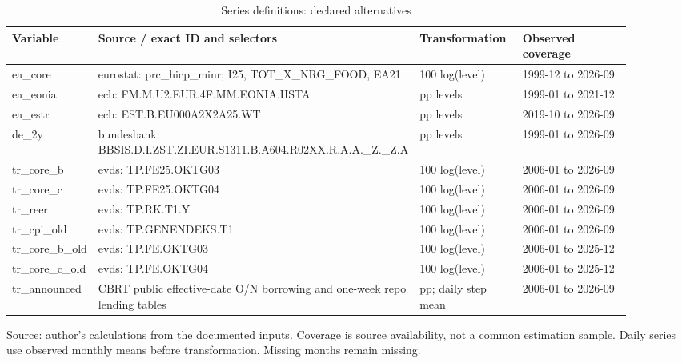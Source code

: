 \begin{table}[htbp]
\centering
\footnotesize
\caption{Series definitions: declared alternatives}
\begin{tabularx}{\linewidth}{p{0.12\linewidth}p{0.40\linewidth}p{0.17\linewidth}p{0.21\linewidth}}
\toprule
Variable & Source / exact ID and selectors & Transformation & Observed coverage \\
\midrule
ea\_\allowbreak{}core & eurostat: prc\_\allowbreak{}hicp\_\allowbreak{}minr; I25, TOT\_\allowbreak{}X\_\allowbreak{}NRG\_\allowbreak{}FOOD, EA21 & 100 log(level) & 1999-12 to 2026-09 \\
ea\_\allowbreak{}eonia & ecb: FM.\allowbreak{}M.\allowbreak{}U2.\allowbreak{}EUR.\allowbreak{}4F.\allowbreak{}MM.\allowbreak{}EONIA.\allowbreak{}HSTA & pp levels & 1999-01 to 2021-12 \\
ea\_\allowbreak{}estr & ecb: EST.B.EU000A2X2A25.WT & pp levels & 2019-10 to 2026-09 \\
de\_\allowbreak{}2y & bundesbank: BBSIS.\allowbreak{}D.\allowbreak{}I.\allowbreak{}ZST.\allowbreak{}ZI.\allowbreak{}EUR.\allowbreak{}S1311.\allowbreak{}B.\allowbreak{}A604.\allowbreak{}R02XX.\allowbreak{}R.\allowbreak{}A.\allowbreak{}A.\allowbreak{}\_\allowbreak{}Z.\allowbreak{}\_\allowbreak{}Z.\allowbreak{}A & pp levels & 1999-01 to 2026-09 \\
tr\_\allowbreak{}core\_\allowbreak{}b & evds: TP.FE25.OKTG03 & 100 log(level) & 2006-01 to 2026-09 \\
tr\_\allowbreak{}core\_\allowbreak{}c & evds: TP.FE25.OKTG04 & 100 log(level) & 2006-01 to 2026-09 \\
tr\_\allowbreak{}reer & evds: TP.RK.T1.Y & 100 log(level) & 2006-01 to 2026-09 \\
tr\_\allowbreak{}cpi\_\allowbreak{}old & evds: TP.GENENDEKS.T1 & 100 log(level) & 2006-01 to 2026-09 \\
tr\_\allowbreak{}core\_\allowbreak{}b\_\allowbreak{}old & evds: TP.FE.OKTG03 & 100 log(level) & 2006-01 to 2025-12 \\
tr\_\allowbreak{}core\_\allowbreak{}c\_\allowbreak{}old & evds: TP.FE.OKTG04 & 100 log(level) & 2006-01 to 2025-12 \\
tr\_\allowbreak{}announced & CBRT public effective-date O/N borrowing and one-week repo lending tables & pp; daily step mean & 2006-01 to 2026-09 \\
\bottomrule
\end{tabularx}
\par\vspace{3pt}\begin{minipage}{\linewidth}\footnotesize Source: author's calculations from the documented inputs.\allowbreak{} Coverage is source availability, not a common estimation sample.\allowbreak{} Daily series use observed monthly means before transformation.\allowbreak{} Missing months remain missing.\allowbreak{}\end{minipage}
\end{table}
